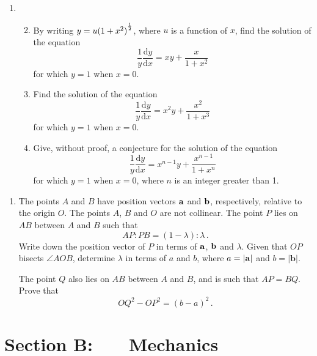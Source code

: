 \documentclass[a4, 11pt]{report}
\newlength{\qspace}
\newcounter{qnumber}
\newenvironment{question}%
 {\vspace{\qspace}
  \begin{enumerate}[\bfseries 1\quad][10]%
    \setcounter{enumi}{\value{qnumber}}%
    \item%
 }
{
  \end{enumerate}
  \filbreak
  \stepcounter{qnumber}
 }
\newenvironment{questionparts}[1][1]%
 {
  \begin{enumerate}[\bfseries (i)]%
    \setcounter{enumii}{#1}
    \addtocounter{enumii}{-1}
    \setlength{\itemsep}{5mm}
    \setlength{\parskip}{8pt}
 }
 {
  \end{enumerate}
 }
\def\d{{\mathrm d}}
\def\bb{\mathbf b}
\begin{document}
\begin{question}
\begin{questionparts}  
\item By writing $y=u{(1+x^2)\vphantom{\dot A}}^{\frac12}$, 
where $u$ is a function of $x$,
find the solution of the equation
\[
\frac 1 y \frac{\d y} {\d x} = xy + \frac x {1+x^2}
\]
for which $y=1$ when $x=0$.

\item Find the solution of the equation
\[
\frac 1 y \frac{\d y} {\d x} = x^2y + \frac {x^2 } {1+x^3}
\]
for which $y=1$ when $x=0$.

\item Give, without proof, a conjecture for 
 the solution of the equation
\[
\frac 1 y \frac{\d y} {\d x} = x^{n-1}y + \frac {x^{n-1} } {1+x^n}
\]
for which $y=1$ when $x=0$, where $n$ is an integer greater than 1.
\end{questionparts}
\end{question}
		
\begin{question}
The points $A$ and $B$ have position vectors $\bf a$ and $\bf b$, 
respectively, relative to the  origin $O$. The points $A$, $B$ and $O$ are
not collinear. The point $P$ 
lies on 
$AB$ between $A$ and $B$ such that 
\[
AP : PB = (1-\lambda):\lambda\,.
\]
Write down 
the position vector of $P$  in terms of $\bf a$,
  $\bf b$ and $\lambda$.
Given that $OP$ bisects $\angle AOB$, determine $\lambda$
in terms of $a$ and $b$, where $a=\vert \bf a\vert$ and $b=\vert
\bb\vert$.

The point $Q$ also lies on $AB$ between $A$ and $B$,
and is such that $AP=BQ$. 
Prove that $$OQ^2-OP^2=(b-a)^2\,.$$
\end{question}	
		

		
	
\newpage
\section*{Section B: \ \ \ Mechanics}
\end{document}
